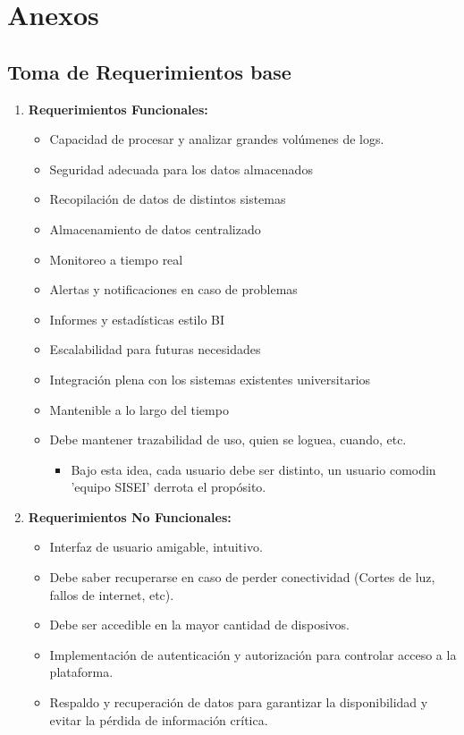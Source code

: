 \section{Anexos}

\subsection{Toma de Requerimientos base}
\label{anexos:requerimientos}

\begin{enumerate}
  \item \textbf{Requerimientos Funcionales:} 
    \begin{itemize}
      \item Capacidad de procesar y analizar grandes volúmenes de logs.
      \item Seguridad adecuada para los datos almacenados
      \item Recopilación de datos de distintos sistemas
      \item Almacenamiento de datos centralizado
      \item Monitoreo a tiempo real
      \item Alertas y notificaciones en caso de problemas
      \item Informes y estadísticas estilo BI
      \item Escalabilidad para futuras necesidades
      \item Integración plena con los sistemas existentes universitarios
      \item Mantenible a lo largo del tiempo
      \item Debe mantener trazabilidad de uso, quien se loguea, cuando, etc.
        \begin{itemize}
          \item Bajo esta idea, cada usuario debe ser distinto, un usuario comodin 'equipo SISEI' derrota el propósito.
        \end{itemize}
    \end{itemize}
  \item \textbf{Requerimientos No Funcionales:} 
    \begin{itemize}
      \item Interfaz de usuario amigable, intuitivo.
      \item Debe saber recuperarse en caso de perder conectividad (Cortes de luz, fallos de internet, etc).
      \item Debe ser accedible en la mayor cantidad de disposivos.
      \item Implementación de autenticación y autorización para controlar acceso a la plataforma.
      \item Respaldo y recuperación de datos para garantizar la disponibilidad y evitar la pérdida de información crítica.
    \end{itemize}
\end{enumerate}


\clearpage

